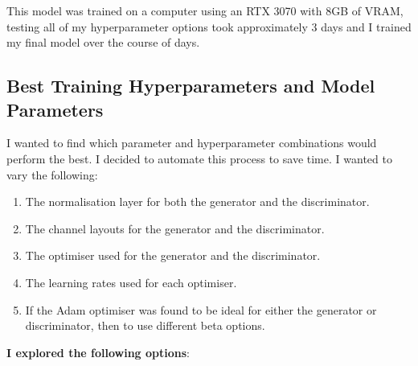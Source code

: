 \documentclass{UoYCSproject}
\begin{document}
This model was trained on a computer using an RTX 3070 with 8GB of VRAM, testing all of my hyperparameter options took approximately 3 days and I trained my final model over the course of 
days.

\subsection{Best Training Hyperparameters and Model Parameters}

I wanted to find which parameter and hyperparameter combinations would perform the best. I decided to automate this process to save time. I wanted to vary the following:
\begin{enumerate}
\item The normalisation layer for both the generator and the discriminator.
\item The channel layouts for the generator and the discriminator.
\item The optimiser used for the generator and the discriminator.
\item The learning rates used for each optimiser.
\item If the Adam optimiser was found to be ideal for either the generator or discriminator, then to use different beta options.
\end{enumerate}

\textbf{I explored the following options}:
\end{document}
